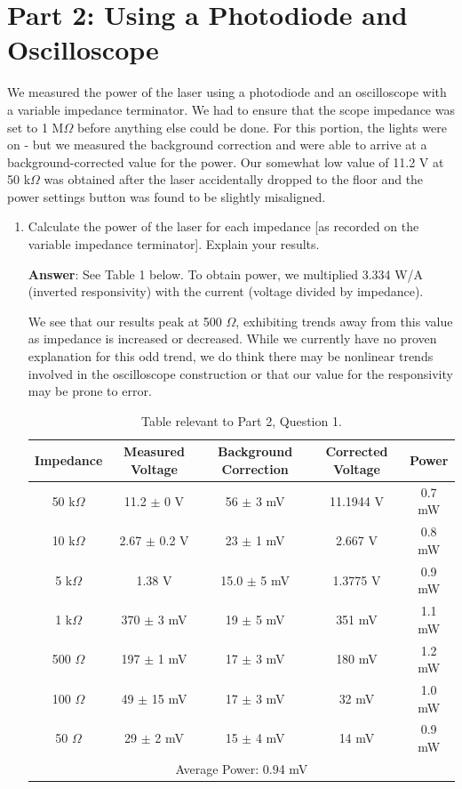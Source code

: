\documentclass[10pt,a4paper]{article}
\begin{document}
\section*{Part 2: Using a Photodiode and Oscilloscope}
We measured the  power of the laser using a photodiode and an oscilloscope with a variable impedance terminator. We had to ensure that the scope impedance was set to 1 M$\Omega$ before anything else could be done. For this portion, the lights were on - but we measured the background correction and were able to arrive at a background-corrected value for the power. Our somewhat low value of 11.2 V at 50 k$\Omega$ was obtained after the laser accidentally dropped to the floor and the power settings button was found to be slightly misaligned. 
\begin{enumerate}
\item Calculate the power of the laser for each impedance [as recorded on the variable impedance terminator]. Explain your results. 

\textbf{Answer}: See Table 1 below. To obtain power, we multiplied 3.334 W/A (inverted responsivity) with the current (voltage divided by impedance).

We see that our results peak at 500 $\Omega$, exhibiting trends away from this value as impedance is increased or decreased. While we currently have no proven explanation for this odd trend, we do think there may be nonlinear trends involved in the oscilloscope construction or that our value for the responsivity may be prone to error. 
\begin{table}[h]
\centering
\begin{tabular}{|ccccc|}
\hline 
Impedance & Measured Voltage & Background Correction & Corrected Voltage & Power \\
\hline 
50 k$\Omega$ & 11.2 $\pm$ 0 V & 56 $\pm$ 3 mV & 11.1944 V & 0.7 mW \\ 
\hline 
10 k$\Omega$ & 2.67 $\pm$ 0.2 V & 23 $\pm$ 1 mV & 2.667 V & 0.8 mW \\ 
\hline 
5 k$\Omega$ & 1.38 V & 15.0 $\pm$ 5 mV & 1.3775 V & 0.9 mW \\ 
\hline 
1 k$\Omega$ & 370 $\pm$ 3 mV & 19 $\pm$ 5 mV & 351 mV & 1.1 mW \\ 
\hline 
500 $\Omega$ & 197 $\pm$ 1 mV & 17 $\pm$ 3 mV & 180 mV & 1.2 mW \\ 
\hline 
100 $\Omega$ & 49 $\pm$ 15 mV & 17 $\pm$ 3 mV & 32 mV & 1.0 mW \\ 
\hline 
50 $\Omega$ & 29 $\pm$ 2 mV & 15 $\pm$ 4 mV & 14 mV & 0.9 mW \\ 
\hline 
\multicolumn{5}{c}{Average Power: 0.94 mV}\\
\hline
\end{tabular}
\caption{Table relevant to Part 2, Question 1.}
\end{table}


\end{enumerate}
\end{document}
